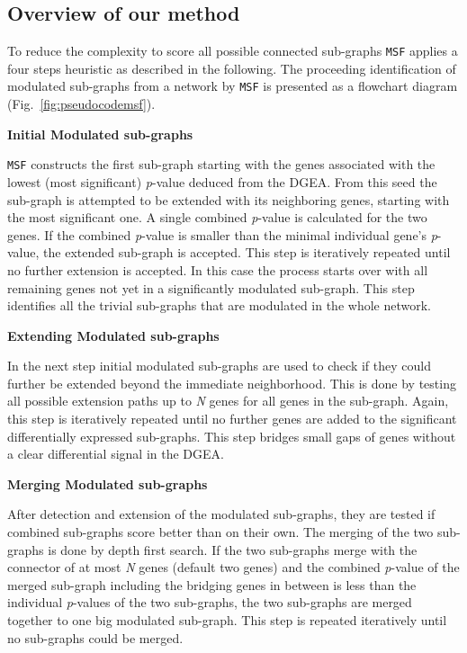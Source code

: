 \documentclass[10pt,a4paper,twocolumn]{article}
\begin{document}
\subsection*{Overview of our method}

To reduce the complexity to score all possible connected sub-graphs
\texttt{MSF} applies a four steps heuristic as described in the
following. The proceeding identification of modulated sub-graphs from a
network by \texttt{MSF} is presented as a flowchart diagram
(Fig.~\ref{fig:pseudocodemsf}).



\textbf{Initial Modulated sub-graphs}

\texttt{MSF} constructs the first sub-graph starting with the genes
associated with the lowest (most significant) \textit{p}-value deduced from
the DGEA. From this seed the sub-graph is attempted to be extended with its
neighboring genes, starting with the most significant one. A single
combined \textit{p}-value is calculated for the two genes. If the combined
\textit{p}-value is smaller than the minimal individual gene's
\textit{p}-value, the extended sub-graph is accepted. This step is
iteratively repeated until no further extension is accepted. In this case
the process starts over with all remaining genes not yet in a significantly
modulated sub-graph. This step identifies all the trivial sub-graphs that
are modulated in the whole network.\newline

\textbf{Extending Modulated sub-graphs}

In the next step initial modulated sub-graphs are used to check if they
could further be extended beyond the immediate neighborhood. This is done
by testing all possible extension paths up to \emph{N} genes for all genes
in the sub-graph. Again, this step is iteratively repeated until no further
genes are added to the significant differentially expressed
sub-graphs. This step bridges small gaps of genes without a clear
differential signal in the DGEA.\newline

\textbf{Merging Modulated sub-graphs}

After detection and extension of the modulated sub-graphs, they are tested
if combined sub-graphs score better than on their own. The merging of the
two sub-graphs is done by depth first search. If the two sub-graphs merge
with the connector of at most \emph{N} genes (default two genes) and the
combined \textit{p}-value of the merged sub-graph including the bridging
genes in between is less than the individual \textit{p}-values of the two
sub-graphs, the two sub-graphs are merged together to one big modulated
sub-graph. This step is repeated iteratively until no sub-graphs could be
merged.\newline
\end{document}
